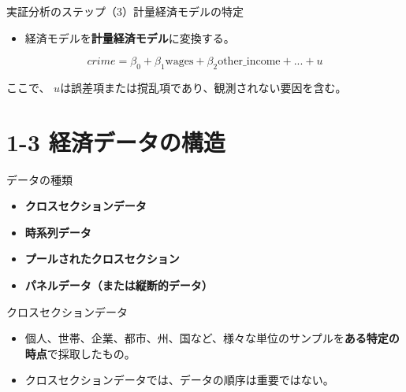 \documentclass[
  ignorenonframetext,
]{beamer}
\providecommand{\tightlist}{%
  \setlength{\itemsep}{0pt}\setlength{\parskip}{0pt}}
\begin{document}
\begin{frame}{実証分析のステップ（3）計量経済モデルの特定}
\label{ux5b9fux8a3cux5206ux6790ux306eux30b9ux30c6ux30c3ux30d73ux8a08ux91cfux7d4cux6e08ux30e2ux30c7ux30ebux306eux7279ux5b9a}
\begin{itemize}
\tightlist
\item
  経済モデルを\textbf{計量経済モデル}に変換する。
\end{itemize}

\[crime = \beta_0 + \beta_1 \text{wages} + \beta_2 \text{other\_income} + ... + u\]

ここで、 \(u\)は誤差項または撹乱項であり、観測されない要因を含む。
\end{frame}

\section{1-3
経済データの構造}\label{ux7d4cux6e08ux30c7ux30fcux30bfux306eux69cbux9020}

\begin{frame}{データの種類}
\label{ux30c7ux30fcux30bfux306eux7a2eux985e}
\begin{itemize}
\tightlist
\item
  \textbf{クロスセクションデータ}
\item
  \textbf{時系列データ}
\item
  \textbf{プールされたクロスセクション}
\item
  \textbf{パネルデータ（または縦断的データ）}
\end{itemize}
\end{frame}

\begin{frame}{クロスセクションデータ}
\label{ux30afux30edux30b9ux30bbux30afux30b7ux30e7ux30f3ux30c7ux30fcux30bf}
\begin{itemize}
\tightlist
\item
  個人、世帯、企業、都市、州、国など、様々な単位のサンプルを\textbf{ある特定の時点}で採取したもの。
\item
  クロスセクションデータでは、データの順序は重要ではない。
\end{itemize}
\end{frame}
\end{document}
